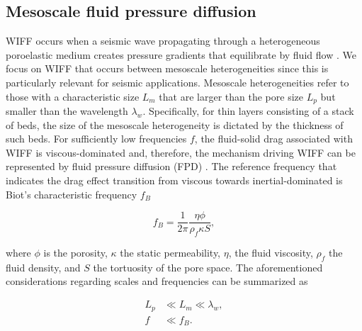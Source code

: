 \documentclass[draft]{agujournal2019}
\begin{document}
\subsection{Mesoscale fluid pressure diffusion}
WIFF occurs when a seismic wave propagating through a heterogeneous poroelastic medium creates
pressure gradients that equilibrate by fluid flow \cite{Muller2010}.
We focus on WIFF that occurs between mesoscale heterogeneities since this is particularly relevant for seismic applications. Mesoscale heterogeneities refer to those with a characteristic size $L_m$ that are larger than the pore size $L_p$ but smaller than the wavelength $\lambda_w$. Specifically, for thin layers consisting of a stack of beds, the size of the mesoscale heterogeneity is dictated by the thickness of such beds.
For sufficiently low frequencies $f$, the fluid-solid drag associated with WIFF is viscous-dominated and, therefore, the mechanism driving WIFF can be represented by fluid pressure diffusion (FPD) \cite{Johnson1987, Pride2005}. The reference frequency that indicates the drag effect transition from viscous towards inertial-dominated is Biot's characteristic frequency $f_B$ \cite{Biot1956, Dutta1979}
\begin{linenomath*}
\begin{equation}\label{Eq.1}
f_B= \frac{1}{2 \pi} \frac{\eta \phi}{ \rho_f \kappa S },
\end{equation}
\end{linenomath*}
where $\phi$ is the porosity, $\kappa$  the static permeability, $\eta$, the fluid viscosity,  $\rho_f$ the fluid density, and $S$ the tortuosity of the pore space. The aforementioned considerations regarding scales and frequencies can be summarized as
\begin{linenomath*}
\begin{equation}\label{Eq.2}
\begin{split}
 L_p & \ll L_m \ll \lambda_w, \\
f & \ll f_B.
\end{split}
\end{equation}
\end{linenomath*}
\end{document}
